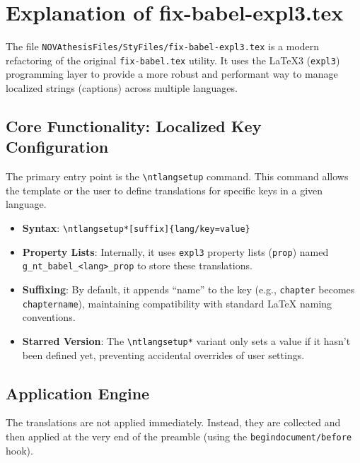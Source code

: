 

\chapter{Explanation of fix-babel-expl3.tex}
\label{annex:fix-babel-expl3}

The file \texttt{NOVAthesisFiles/StyFiles/fix-babel-expl3.tex} is a modern refactoring of the original \texttt{fix-babel.tex} utility. It uses the \LaTeX3 (\texttt{expl3}) programming layer to provide a more robust and performant way to manage localized strings (captions) across multiple languages.

\section{Core Functionality: Localized Key Configuration}
The primary entry point is the \texttt{\textbackslash ntlangsetup} command. This command allows the template or the user to define translations for specific keys in a given language.

\begin{itemize}
    \item \textbf{Syntax}: \texttt{\textbackslash ntlangsetup*[suffix]\{lang/key=value\}}
    \item \textbf{Property Lists}: Internally, it uses \texttt{expl3} property lists (\texttt{prop}) named \texttt{g\_nt\_babel\_<lang>\_prop} to store these translations.
    \item \textbf{Suffixing}: By default, it appends ``name'' to the key (e.g., \texttt{chapter} becomes \texttt{chaptername}), maintaining compatibility with standard \LaTeX{} naming conventions.
    \item \textbf{Starred Version}: The \texttt{\textbackslash ntlangsetup*} variant only sets a value if it hasn't been defined yet, preventing accidental overrides of user settings.
\end{itemize}

\section{Application Engine}
The translations are not applied immediately. Instead, they are collected and then applied at the very end of the preamble (using the \texttt{begindocument/before} hook).

